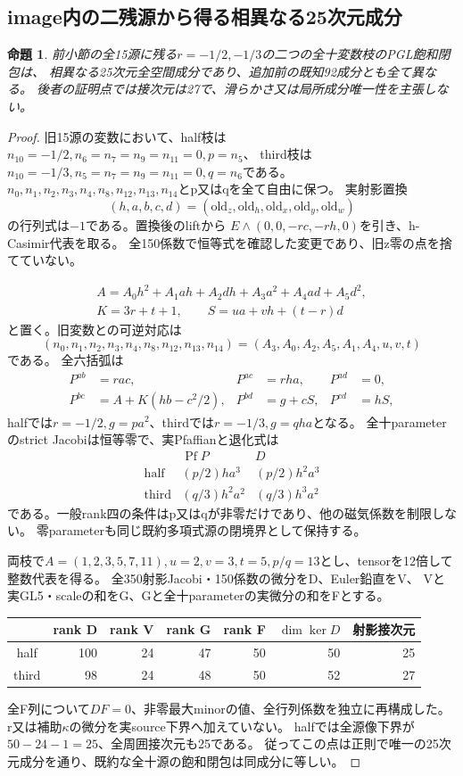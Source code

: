 \documentclass[a4paper,11pt]{ltjsarticle}
\newtheorem{proposition}{命題}[section]
\theoremstyle{definition}
\begin{document}
\subsection{image内の二残源から得る相異なる25次元成分}
\begin{proposition}\label{prop:nil31-image-two-components}
前小節の全15源に残る$r=-1/2,-1/3$の二つの全十変数枝のPGL飽和閉包は、
相異なる25次元全空間成分であり、追加前の既知92成分とも全て異なる。
後者の証明点では接次元は27で、滑らかさ又は局所成分唯一性を主張しない。
\end{proposition}
\begin{proof}
旧15源の変数において、half枝は$n_{10}=-1/2,n_6=n_7=n_9=n_{11}=0,p=n_5$、
third枝は$n_{10}=-1/3,n_5=n_7=n_9=n_{11}=0,q=n_6$である。
$n_0,n_1,n_2,n_3,n_4,n_8,n_{12},n_{13},n_{14}$とp又はqを全て自由に保つ。
実射影置換
\[
 (h,a,b,c,d)=(\mathrm{old}_z,\mathrm{old}_h,
                 \mathrm{old}_x,\mathrm{old}_y,\mathrm{old}_w)
\]
の行列式は$-1$である。置換後のliftから
$E\wedge(0,0,-rc,-rh,0)$を引き、h-Casimir代表を取る。
全150係数で恒等式を確認した変更であり、旧z零の点を捨てていない。

\[
\begin{gathered}
 A=A_0h^2+A_1ah+A_2dh+A_3a^2+A_4ad+A_5d^2,\\
 K=3r+t+1,\qquad S=ua+vh+(t-r)d
\end{gathered}
\]
と置く。旧変数との可逆対応は
\[
 (n_0,n_1,n_2,n_3,n_4,n_8,n_{12},n_{13},n_{14})=(A_3,A_0,A_2,A_5,A_1,A_4,u,v,t)
\]
である。
全六括弧は
\[
\begin{aligned}
 P^{ab}&=rac,&P^{ac}&=rha,&P^{ad}&=0,\\
 P^{bc}&=A+K(hb-c^2/2),&P^{bd}&=g+cS,&P^{cd}&=hS,
\end{aligned}
\]
halfでは$r=-1/2,g=pa^2$、thirdでは$r=-1/3,g=qha$となる。
全十parameterのstrict Jacobiは恒等零で、実Pfaffianと退化式は
\[
\begin{array}{c|c|c}
 &\operatorname{Pf}P&D\\\hline
 \mathrm{half}&(p/2)ha^3&(p/2)h^2a^3\\
 \mathrm{third}&(q/3)h^2a^2&(q/3)h^3a^2
\end{array}
\]
である。一般rank四の条件はp又はqが非零だけであり、他の磁気係数を制限しない。
零parameterも同じ既約多項式源の閉境界として保持する。

両枝で$A=(1,2,3,5,7,11),u=2,v=3,t=5,p/q=13$とし、tensorを12倍して整数代表を得る。
全350射影Jacobi・150係数の微分をD、Euler鉛直をV、
Vと実GL5・scaleの和をG、Gと全十parameterの実微分の和をFとする。
\begin{center}\small
\begin{tabular}{c|r|r|r|r|r|r}
 &rank D&rank V&rank G&rank F&$\dim\ker D$&射影接次元\\\hline
half&100&24&47&50&50&25\\
third&98&24&48&50&52&27
\end{tabular}
\end{center}
全F列について$DF=0$、非零最大minorの値、全行列係数を独立に再構成した。
r又は補助$\kappa$の微分を実source下界へ加えていない。
halfでは全源像下界が$50-24-1=25$、全周囲接次元も25である。
従ってこの点は正則で唯一の25次元成分を通り、既約な全十源の飽和閉包は同成分に等しい。


\end{proof}
\end{document}

